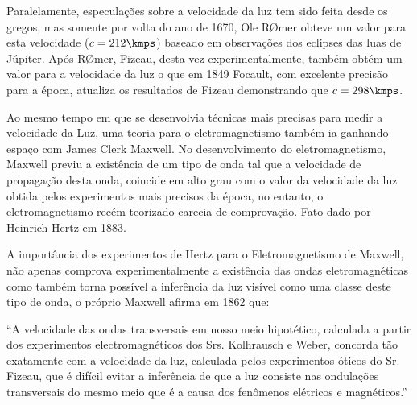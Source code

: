     Paralelamente, especulações sobre a velocidade da luz tem sido feita desde os gregos, mas somente por volta do ano de 1670, Ole RØmer obteve um valor para esta velocidade ($c=212\kmps$) baseado em observações dos eclipses das luas de Júpiter. Após RØmer, Fizeau, desta vez experimentalmente, também obtém um valor para a velocidade da luz o que em 1849 Focault, com excelente precisão para a época, atualiza os resultados de Fizeau demonstrando que $c=298\kmps$.

    Ao mesmo tempo em que se desenvolvia técnicas mais precisas para medir a velocidade da Luz, uma teoria para o eletromagnetismo também ia ganhando espaço com James Clerk Maxwell. No desenvolvimento do eletromagnetismo, Maxwell previu a existência de um tipo de onda tal que a velocidade de propagação desta onda, coincide em alto grau com o valor da velocidade da luz obtida pelos experimentos mais precisos da época, no entanto, o eletromagnetismo recém teorizado carecia de comprovação. Fato dado por Heinrich Hertz em 1883.

    A importância dos experimentos de Hertz para o Eletromagnetismo de Maxwell, não apenas comprova experimentalmente a existência das ondas eletromagnéticas como também torna possível a inferência da luz visível como uma classe deste tipo de onda, o próprio Maxwell afirma em 1862 que:

    \begin{citacao}
        ``A velocidade das ondas transversais em nosso meio hipotético, calculada a partir dos experimentos electromagnéticos dos Srs. Kolhrausch e Weber, concorda tão exatamente com a velocidade da luz, calculada pelos experimentos óticos do Sr. Fizeau, que é difícil evitar a inferência de que a luz consiste nas ondulações transversais do mesmo meio que é a causa dos fenômenos elétricos e magnéticos.'' \cite{NUSSENZVEIG31997}
    \end{citacao}






